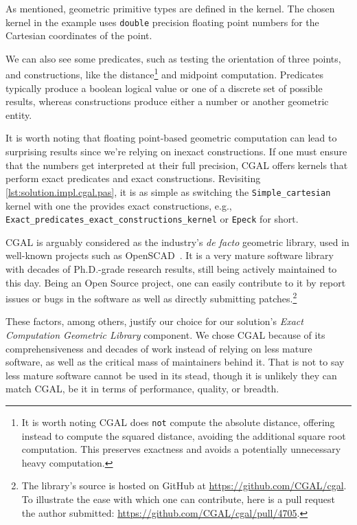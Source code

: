 As mentioned, geometric primitive types are defined in the kernel.  The chosen
kernel in the example uses \texttt{double} precision floating point numbers for
the Cartesian coordinates of the point.

We can also see some predicates, such as testing the orientation of three
points, and constructions, like the distance\footnote{It is worth noting
\ac{CGAL} does \texttt{not} compute the absolute distance, offering instead to
compute the squared distance, avoiding the additional square root computation.
This preserves exactness and avoids a potentially unnecessary heavy
computation.} and midpoint computation.  Predicates typically produce a boolean
logical value or one of a discrete set of possible results, whereas
constructions produce either a number or another geometric entity.

It is worth noting that floating point-based geometric computation can lead to
surprising results since we're relying on inexact constructions.  If one must
ensure that the numbers get interpreted at their full precision, \ac{CGAL}
offers kernels that perform exact predicates and exact constructions.
Revisiting \cref{lst:solution.impl.cgal.pas}, it is as simple as switching the
\texttt{Simple\_cartesian} kernel with one the provides exact constructions,
e.g., \texttt{Exact\_predicates\_exact\_constructions\_kernel} or \texttt{Epeck}
for short.

\ac{CGAL} is arguably considered as the industry's \textit{de facto} geometric
library, used in well-known projects such as
OpenSCAD~\cite{Kintel:2019:OpenSCAD}.  It is a very mature software library with
decades of Ph.D.-grade research results, still being actively maintained to this
day.  Being an Open Source project, one can easily contribute to it by report
issues or bugs in the software as well as directly submitting
patches.\footnote{The library's source is hosted on GitHub at
\url{https://github.com/CGAL/cgal}.  To illustrate the ease with which one can
contribute, here is a pull request the author submitted:
\url{https://github.com/CGAL/cgal/pull/4705}.}

These factors, among others, justify our choice for our solution's \textit{Exact
Computation Geometric Library} component.  We chose \ac{CGAL} because of its
comprehensiveness and decades of work instead of relying on less mature
software, as well as the critical mass of maintainers behind it.  That is not to
say less mature software cannot be used in its stead, though it is unlikely they
can match \ac{CGAL}, be it in terms of performance, quality, or breadth.

